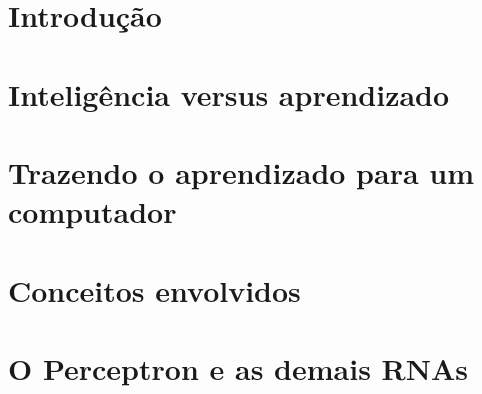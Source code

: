 \documentclass[aspectratio=169]{beamer} %
\begin{document}
{
	
\begin{frame}
\maketitle
	
\end{frame}
}










\section{Introdu\c{c}ão} 

\section{Inteligência versus aprendizado}

\section{Trazendo o aprendizado para um computador}

\section{Conceitos envolvidos}

\section{O Perceptron e as demais RNAs}
\end{document}
